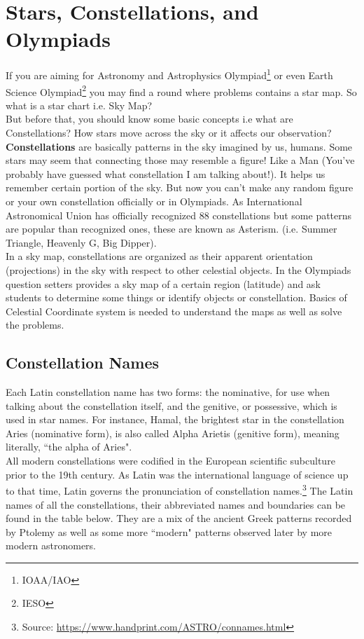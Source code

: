 \documentclass[a4paper,12pt]{extarticle}
\begin{document}
\section{Stars, Constellations, and Olympiads}
 
If you are aiming for Astronomy and Astrophysics Olympiad\footnote{IOAA/IAO} or even Earth Science Olympiad\footnote{IESO} you may find a round where problems contains a star map. So what is a star chart i.e. Sky Map?\\

But before that, you should know some basic concepts i.e what are Constellations? How stars move across the sky or it affects our observation? \\

\textbf{Constellations} are basically patterns in the sky imagined by us, humans. Some stars may seem that connecting those may resemble a figure! Like a Man (You've probably have guessed what constellation I am talking about!). It helps us remember certain portion of the sky. But now you can’t make any random figure or your own constellation officially or in Olympiads. As International Astronomical Union has officially recognized 88 constellations but some patterns are popular than recognized ones, these are known as Asterism. (i.e. Summer Triangle, Heavenly G, Big Dipper).\\

In a sky map, constellations are organized as their apparent orientation (projections) in the sky with respect to other celestial objects. In the Olympiads question setters provides a sky map of a certain region (latitude) and ask students to determine some things or identify objects or constellation. Basics of
Celestial Coordinate system is needed to understand the maps as well as solve the problems.

\subsection{Constellation Names}

Each Latin constellation name has two forms: the nominative, for use when talking about the constellation itself, and the genitive, or possessive, which is used in star names. For instance, Hamal, the brightest star in the constellation Aries (nominative form), is also called Alpha Arietis (genitive form), meaning literally, ``the alpha of Aries".\\

All modern constellations were codified in the European scientific subculture prior to the 19th century. As Latin was the international language of science up to that time, Latin governs the pronunciation of constellation names.\footnote{Source: \url{https://www.handprint.com/ASTRO/connames.html}} The Latin names of all the constellations, their abbreviated names and boundaries can be found in the table below. They are a mix of the ancient Greek patterns recorded by Ptolemy as well as some more ``modern" patterns observed later by more modern astronomers.\\
\end{document}
